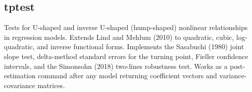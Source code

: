 \begin{Shaded}
\begin{Highlighting}[]
\OtherTok{\textless{}{-}} \NormalTok{(} \NormalTok{(}\NormalTok{, }\NormalTok{,}
                  \NormalTok{), } \NormalTok{)}

\OtherTok{\textless{}{-}}  \NormalTok{,}
                         \NormalTok{)}

\OtherTok{\textless{}{-}}  \NormalTok{,}
                 \NormalTok{, } \NormalTok{)}
\end{Highlighting}
\end{Shaded}

\subsection{tptest}\label{tptest}

Tests for U-shaped and inverse U-shaped (hump-shaped) nonlinear
relationships in regression models. Extends Lind and Mehlum (2010) to
quadratic, cubic, log-quadratic, and inverse functional forms.
Implements the Sasabuchi (1980) joint slope test, delta-method standard
errors for the turning point, Fieller confidence intervals, and the
Simonsohn (2018) two-lines robustness test. Works as a post-estimation
command after any model returning coefficient vectors and
variance-covariance matrices.

